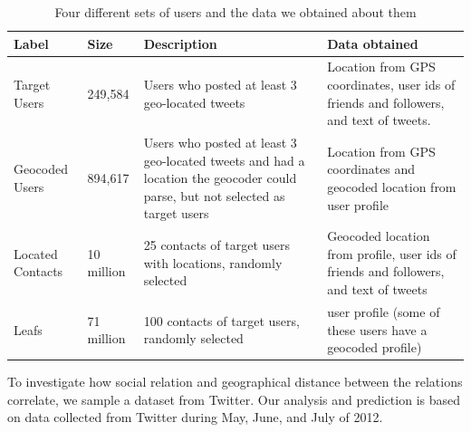 \begin{table}[tb]
\scriptsize
\centering
\begin{tabular}{l l p{4cm} p{6cm}}
    Label & Size & Description & Data obtained \\
    \hline
    Target Users & 249,584 & Users who posted at least 3 geo-located tweets &
    Location from GPS coordinates, user ids of friends and followers,
    and text of tweets. \\
    Geocoded Users & 894,617 & Users who posted at least 3 geo-located tweets
    and had a location the geocoder could parse, but not selected as target users &
    Location from GPS coordinates and geocoded location from user profile \\
    Located Contacts & 10 million & 25 contacts of target users with locations, randomly selected &
    Geocoded location from profile, user ids of friends and followers, and text of tweets \\
    Leafs & 71 million & 100 contacts of target users, randomly selected &
    user profile (some of these users have a geocoded profile)\\
\end{tabular}
\caption{Four different sets of users and the data we obtained about them}
\label{tab:datasets}
\end{table}



To investigate how social relation and geographical distance between the
relations correlate, we sample a dataset from Twitter.
%
Our analysis and prediction is based on data collected from Twitter during
May, June, and July of 2012.

